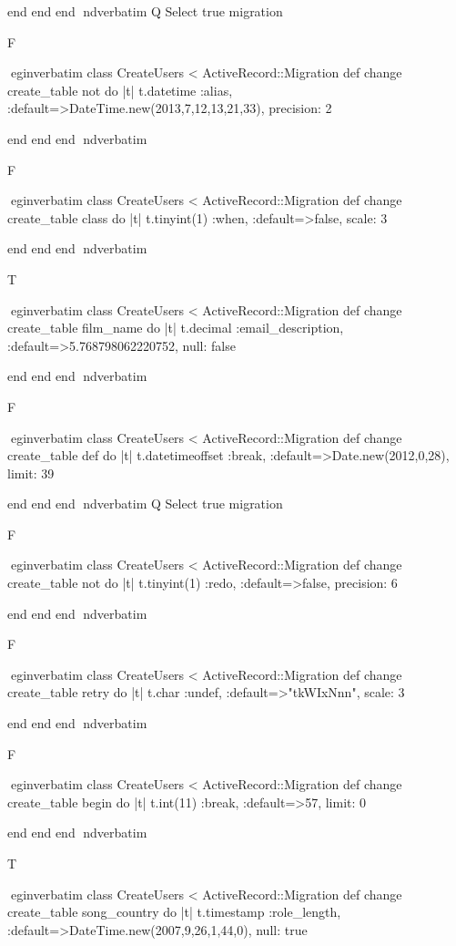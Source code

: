     end 
  end 
end
nd{verbatim}
Q
 Select true migration

F

egin{verbatim}
 class CreateUsers < ActiveRecord::Migration 
  def change 
    create_table not do |t| 
      t.datetime :alias, :default=>DateTime.new(2013,7,12,13,21,33), precision: 2
    
    end 
  end 
end
nd{verbatim}

F

egin{verbatim}
 class CreateUsers < ActiveRecord::Migration 
  def change 
    create_table class do |t| 
      t.tinyint(1) :when, :default=>false, scale: 3
    
    end 
  end 
end
nd{verbatim}

T

egin{verbatim}
 class CreateUsers < ActiveRecord::Migration 
  def change 
    create_table film_name do |t| 
      t.decimal :email_description, :default=>5.768798062220752, null: false
    
    end 
  end 
end
nd{verbatim}

F

egin{verbatim}
 class CreateUsers < ActiveRecord::Migration 
  def change 
    create_table def do |t| 
      t.datetimeoffset :break, :default=>Date.new(2012,0,28), limit: 39
    
    end 
  end 
end
nd{verbatim}
Q
 Select true migration

F

egin{verbatim}
 class CreateUsers < ActiveRecord::Migration 
  def change 
    create_table not do |t| 
      t.tinyint(1) :redo, :default=>false, precision: 6
    
    end 
  end 
end
nd{verbatim}

F

egin{verbatim}
 class CreateUsers < ActiveRecord::Migration 
  def change 
    create_table retry do |t| 
      t.char :undef, :default=>"tkWIxNnn", scale: 3
    
    end 
  end 
end
nd{verbatim}

F

egin{verbatim}
 class CreateUsers < ActiveRecord::Migration 
  def change 
    create_table begin do |t| 
      t.int(11) :break, :default=>57, limit: 0
    
    end 
  end 
end
nd{verbatim}

T

egin{verbatim}
 class CreateUsers < ActiveRecord::Migration 
  def change 
    create_table song_country do |t| 
      t.timestamp :role_length, :default=>DateTime.new(2007,9,26,1,44,0), null: true
    
